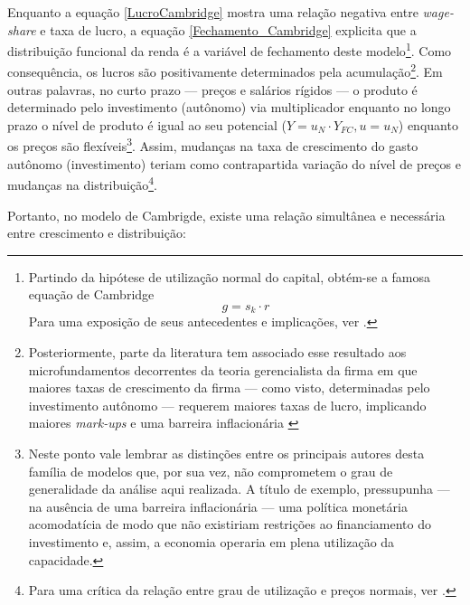 Enquanto a equação \ref{LucroCambridge} mostra uma relação negativa entre \textit{wage-share} e taxa de lucro, a equação \ref{Fechamento_Cambridge} explicita que a distribuição funcional da renda é a variável de fechamento deste modelo\footnote{
	Partindo da hipótese de utilização normal do capital, obtém-se a famosa equação de Cambridge
	\begin{equation}
	\label{EqCambridge}
	g = s_k\cdot r
	\end{equation}
	Para uma exposição de seus antecedentes e implicações, ver \textcite{bortis_notes_1993}.
}.  Como consequência, os lucros são positivamente determinados pela acumulação\footnote{
	Posteriormente, parte da literatura tem associado esse resultado aos microfundamentos decorrentes da teoria gerencialista da firma em que maiores taxas de crescimento da firma --- como visto, determinadas pelo investimento autônomo --- requerem maiores taxas de lucro, implicando maiores \textit{mark-ups} e uma barreira inflacionária \cite[p.~353]{lavoie_post-keynesian_2015}
}. 
Em outras palavras, no curto prazo --- preços e salários rígidos --- o produto é determinado pelo investimento (autônomo) via multiplicador enquanto no longo prazo o nível de produto é igual ao seu potencial ($Y = u_N\cdot Y_{FC},u=u_N$) enquanto os preços são flexíveis\footnote{
	Neste ponto vale lembrar as distinções entre os principais autores desta família de modelos que, por sua vez, não comprometem o grau de generalidade da análise aqui realizada. 
	A título de exemplo, \textcite{robinson_model_1962} pressupunha --- na ausência de uma barreira inflacionária --- uma política monetária acomodatícia de modo que não existiriam restrições ao financiamento do investimento e, assim, a economia operaria em plena utilização da capacidade.
}. Assim, mudanças na taxa de crescimento do gasto autônomo (investimento) teriam como contrapartida variação do nível de preços e mudanças na distribuição\footnote{Para uma crítica da relação entre grau de utilização e preços normais, ver \textcite{ciccone_2017}.}. 

Portanto, no modelo de Cambrigde, existe uma relação simultânea e necessária entre crescimento e distribuição:

